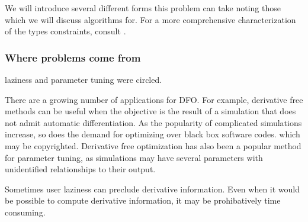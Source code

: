 \documentclass{article}
\begin{document}
%

We will introduce several different forms this problem can take noting those which we will discuss algorithms for.
For a more comprehensive characterization of the types constraints, consult \cite{DUMMY:typesofconstraints}.


\subsubsection{Where problems come from}

\color{red}
laziness and parameter tuning were circled.


There are a growing number of applications for DFO. 
For example, derivative free methods can be useful when the objective is the result of a simulation that does not admit automatic differentiation.
As the popularity of complicated simulations increase, so does the demand for optimizing over black box software codes.
 which may be copyrighted.
Derivative free optimization has also been a popular method for parameter tuning, as simulations may have several parameters with unidentified relationships to their output.

\color{black}




Sometimes user laziness can preclude derivative information.
Even when it would be possible to compute derivative information, it may be prohibatively time consuming.
\end{document}

